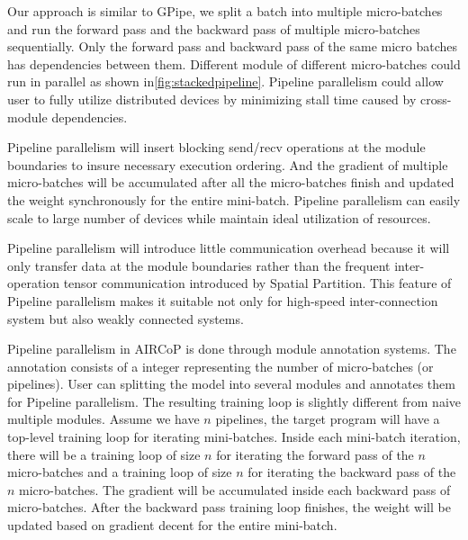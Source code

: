 \documentclass[sigplan]{acmart}\settopmatter{printfolios=true,printccs=false,printacmref=false}
\begin{document}
 Our approach is similar to GPipe\cite{huang2019gpipe}, we split a batch into multiple micro-batches and run the forward pass and the backward pass of multiple micro-batches sequentially. Only the forward pass and backward pass of the same micro batches has dependencies between them. Different module of different micro-batches could run in parallel as shown in\ref{fig:stackedpipeline}. Pipeline parallelism could allow user to fully utilize distributed devices by minimizing stall time caused by cross-module dependencies. \par
 Pipeline parallelism will insert blocking send/recv operations at the module boundaries to insure necessary execution ordering. And the gradient of multiple micro-batches will be accumulated after all the micro-batches finish and updated the weight synchronously for the entire mini-batch. Pipeline parallelism can easily scale to large number of devices while maintain ideal utilization of resources.\par
 Pipeline parallelism will introduce little communication overhead because it will only transfer data at the module boundaries rather than the frequent inter-operation tensor communication introduced by Spatial Partition. This feature of Pipeline parallelism makes it suitable not only for high-speed inter-connection system but also weakly connected systems. \par
 Pipeline parallelism in AIRCoP is done through module annotation systems. The annotation consists of a integer representing the number of micro-batches (or pipelines). User can splitting the model into several modules and annotates them for Pipeline parallelism. The resulting training loop is slightly different from naive multiple modules. Assume we have $n$ pipelines, the target program will have a top-level training loop for iterating mini-batches. Inside each mini-batch iteration, there will be a training loop of size $n$ for iterating the forward pass of the $n$ micro-batches and a training loop of size $n$ for iterating the backward pass of the $n$ micro-batches. The gradient will be accumulated inside each backward pass of micro-batches. After the backward pass training loop finishes, the weight will be updated based on gradient decent for the entire mini-batch.
\end{document}
